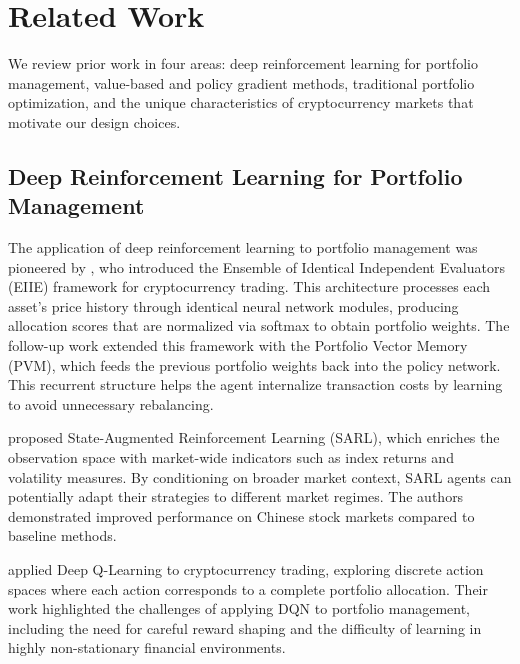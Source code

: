 
\section{Related Work}
\label{sec:related_work}

We review prior work in four areas: deep reinforcement learning for portfolio management, value-based and policy gradient methods, traditional portfolio optimization, and the unique characteristics of cryptocurrency markets that motivate our design choices.

\subsection{Deep Reinforcement Learning for Portfolio Management}
\label{subsec:drl_portfolio}

The application of deep reinforcement learning to portfolio management was pioneered by \citet{jiang2016drlt}, who introduced the Ensemble of Identical Independent Evaluators (EIIE) framework for cryptocurrency trading. This architecture processes each asset's price history through identical neural network modules, producing allocation scores that are normalized via softmax to obtain portfolio weights. The follow-up work \cite{jiang2017eIIE} extended this framework with the Portfolio Vector Memory (PVM), which feeds the previous portfolio weights back into the policy network. This recurrent structure helps the agent internalize transaction costs by learning to avoid unnecessary rebalancing.

\citet{ye2020sarl} proposed State-Augmented Reinforcement Learning (SARL), which enriches the observation space with market-wide indicators such as index returns and volatility measures. By conditioning on broader market context, SARL agents can potentially adapt their strategies to different market regimes. The authors demonstrated improved performance on Chinese stock markets compared to baseline methods.

\citet{lucarelli2020dqlcrypto} applied Deep Q-Learning to cryptocurrency trading, exploring discrete action spaces where each action corresponds to a complete portfolio allocation. Their work highlighted the challenges of applying DQN to portfolio management, including the need for careful reward shaping and the difficulty of learning in highly non-stationary financial environments.

